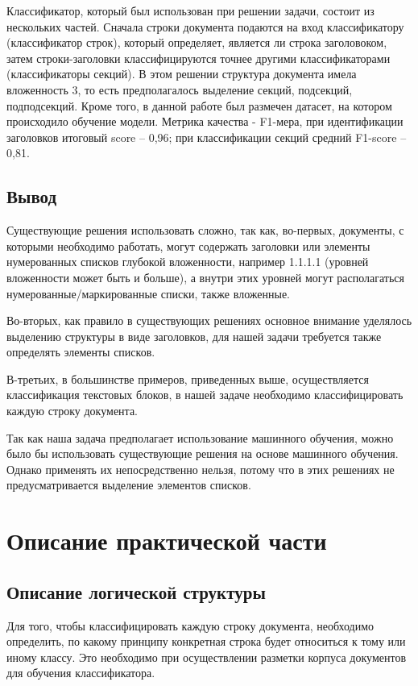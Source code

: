 \documentclass[a4paper,12pt]{article}
\begin{document}
Классификатор, который был использован при решении задачи, состоит из нескольких частей. Сначала строки документа подаются на вход классификатору (классификатор строк), который определяет, является ли строка заголовоком, затем строки-заголовки классифицируются точнее другими классификаторами (классификаторы секций). В этом решении структура документа имела вложенность 3, то есть предполагалось выделение секций, подсекций, подподсекций.
Кроме того, в данной работе был размечен датасет, на котором происходило обучение модели. Метрика качества - F1-мера, при идентификации заголовков итоговый score -- 0,96; при классификации секций средний F1-score -- 0,81.

\subsection{Вывод}
Существующие решения использовать сложно, так как, во-первых, документы, с которыми необходимо работать, могут содержать заголовки или элементы нумерованных списков глубокой вложенности, например 1.1.1.1 (уровней вложенности может быть и больше), а внутри этих уровней могут располагаться нумерованные/маркированные списки, также вложенные.

Во-вторых, как правило в существующих решениях основное внимание уделялось выделению структуры в виде заголовков, для нашей задачи требуется также определять элементы списков.

В-третьих, в большинстве примеров, приведенных выше, осуществляется классификация текстовых блоков, в нашей задаче необходимо классифицировать каждую строку документа.


Так как наша задача предполагает использование машинного обучения, можно было бы использовать существующие решения на основе машинного обучения. Однако применять их непосредственно нельзя, потому что в этих решениях не предусматривается выделение элементов списков.

\newpage
\section{Описание практической части}

\subsection{Описание логической структуры}

Для того, чтобы классифицировать каждую строку документа, необходимо определить, по какому принципу конкретная строка будет относиться к тому или иному классу. Это необходимо при осуществлении разметки корпуса документов для обучения классификатора. 
\end{document}
